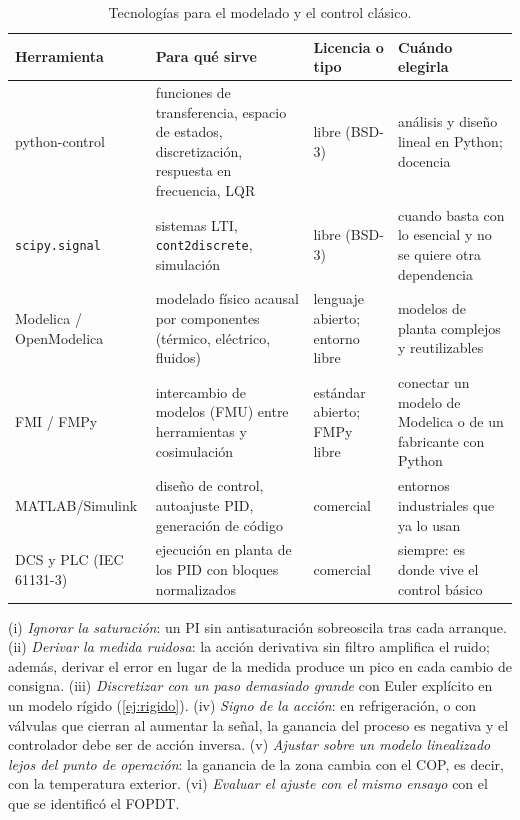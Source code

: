 \begin{table}[htbp]
\centering\footnotesize
\begin{tabularx}{\textwidth}{@{}>{\raggedright\arraybackslash}p{3.1cm}>{\raggedright\arraybackslash}X>{\raggedright\arraybackslash}p{2.0cm}>{\raggedright\arraybackslash}X@{}}
\toprule
Herramienta & Para qué sirve & Licencia o tipo & Cuándo elegirla \\
\midrule
python-control~\cite{pycontrol} & funciones de transferencia, espacio de estados, discretización, respuesta en frecuencia, LQR & libre (BSD-3) & análisis y diseño lineal en Python; docencia \\
\texttt{scipy.signal} & sistemas LTI, \texttt{cont2discrete}, simulación & libre (BSD-3) & cuando basta con lo esencial y no se quiere otra dependencia \\
Modelica / OpenModelica~\cite{modelica} & modelado físico acausal por componentes (térmico, eléctrico, fluidos) & lenguaje abierto; entorno libre & modelos de planta complejos y reutilizables \\
FMI / FMPy~\cite{fmi} & intercambio de modelos (FMU) entre herramientas y cosimulación & estándar abierto; FMPy libre & conectar un modelo de Modelica o de un fabricante con Python \\
MATLAB/Simulink & diseño de control, autoajuste PID, generación de código & comercial & entornos industriales que ya lo usan \\
DCS y PLC (IEC 61131-3) & ejecución en planta de los PID con bloques normalizados & comercial & siempre: es donde vive el control básico \\
\bottomrule
\end{tabularx}
\caption{Tecnologías para el modelado y el control clásico.}
\label{tab:tec1}
\end{table}

\begin{observacion}\label{obs:errores1}
(i) \emph{Ignorar la saturación}: un PI sin antisaturación sobreoscila tras cada arranque. (ii) \emph{Derivar la medida ruidosa}: la acción derivativa sin filtro amplifica el ruido; además, derivar el error en lugar de la medida produce un pico en cada cambio de consigna. (iii) \emph{Discretizar con un paso demasiado grande} con Euler explícito en un modelo rígido (\cref{ej:rigido}). (iv) \emph{Signo de la acción}: en refrigeración, o con válvulas que cierran al aumentar la señal, la ganancia del proceso es negativa y el controlador debe ser de acción inversa. (v) \emph{Ajustar sobre un modelo linealizado lejos del punto de operación}: la ganancia de la zona cambia con el COP, es decir, con la temperatura exterior. (vi) \emph{Evaluar el ajuste con el mismo ensayo} con el que se identificó el FOPDT.
\end{observacion}

